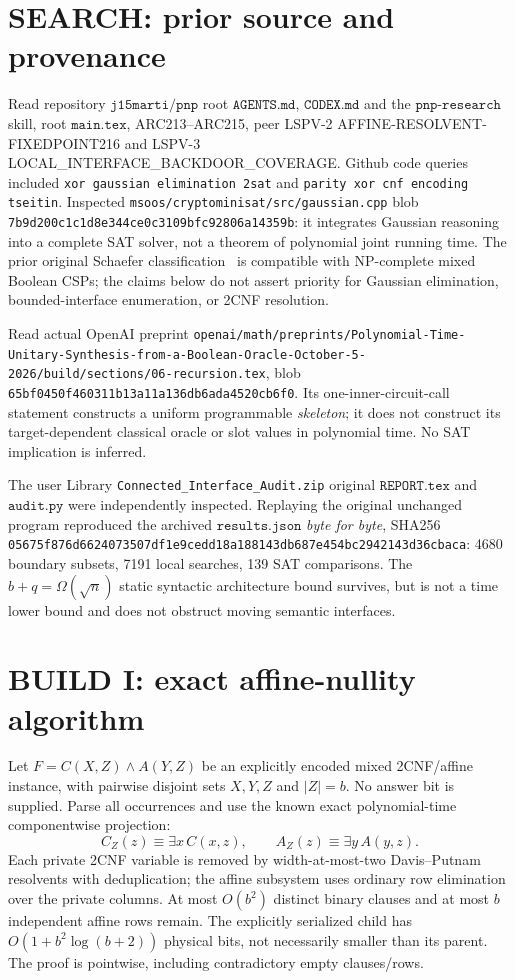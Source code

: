 \documentclass[11pt]{article}
\begin{document}
\section{SEARCH: prior source and provenance}
Read repository $\texttt{j15marti/pnp}$ root $\texttt{AGENTS.md}$, $\texttt{CODEX.md}$ and the $\texttt{pnp-research}$ skill, root $\texttt{main.tex}$, ARC213--ARC215, peer LSPV-2 AFFINE-RESOLVENT-FIXEDPOINT216 and LSPV-3 LOCAL_INTERFACE_BACKDOOR_COVERAGE. Github code queries included \texttt{xor gaussian elimination 2sat} and \texttt{parity xor cnf encoding tseitin}. Inspected \texttt{msoos/cryptominisat/src/gaussian.cpp} blob \texttt{7b9d200c1c1d8e344ce0c3109bfc92806a14359b}: it integrates Gaussian reasoning into a complete SAT solver, not a theorem of polynomial joint running time. The prior original Schaefer classification~\cite{schaefer1978} is compatible with NP-complete mixed Boolean CSPs; the claims below do not assert priority for Gaussian elimination, bounded-interface enumeration, or 2CNF resolution.

Read actual OpenAI preprint \texttt{openai/math/preprints/Polynomial-Time-Unitary-Synthesis-from-a-Boolean-Oracle-October-5-2026/build/sections/06-recursion.tex}, blob \texttt{65bf0450f460311b13a11a136db6ada4520cb6f0}. Its one-inner-circuit-call statement constructs a uniform programmable \emph{skeleton}; it does not construct its target-dependent classical oracle or slot values in polynomial time. No SAT implication is inferred.

The user Library \texttt{Connected_Interface_Audit.zip} original $\texttt{REPORT.tex}$ and $\texttt{audit.py}$ were independently inspected. Replaying the original unchanged program reproduced the archived $\texttt{results.json}$ \emph{byte for byte}, SHA256 \texttt{05675f876d6624073507df1e9cedd18a188143db687e454bc2942143d36cbaca}: 4680 boundary subsets, 7191 local searches, 139 SAT comparisons. The $b+q=\Omega(\sqrt n)$ static syntactic architecture bound survives, but is not a time lower bound and does not obstruct moving semantic interfaces.

\section{BUILD I: exact affine-nullity algorithm}
Let $F=C(X,Z)\wedge A(Y,Z)$ be an explicitly encoded mixed 2CNF/affine instance, with pairwise disjoint sets $X,Y,Z$ and $|Z|=b$. No answer bit is supplied. Parse all occurrences and use the known exact polynomial-time componentwise projection:
\[
 C_Z(z)\equiv\exists x\,C(x,z),\qquad A_Z(z)\equiv\exists y\,A(y,z).
\]
Each private 2CNF variable is removed by width-at-most-two Davis--Putnam resolvents with deduplication; the affine subsystem uses ordinary row elimination over the private columns. At most $O(b^2)$ distinct binary clauses and at most $b$ independent affine rows remain. The explicitly serialized child has $O(1+b^2\log(b+2))$ physical bits, not necessarily smaller than its parent. The proof is pointwise, including contradictory empty clauses/rows.
\end{document}
